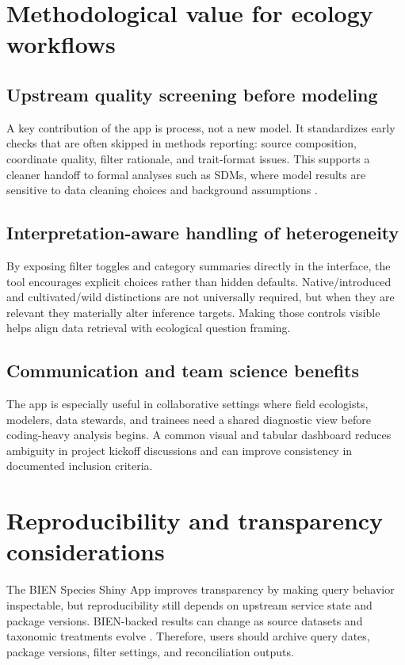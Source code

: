 \documentclass[11pt]{article}
\begin{document}
\section*{Methodological value for ecology workflows}
\subsection*{Upstream quality screening before modeling}
A key contribution of the app is process, not a new model. It standardizes early checks that are often skipped in methods reporting: source composition, coordinate quality, filter rationale, and trait-format issues. This supports a cleaner handoff to formal analyses such as SDMs, where model results are sensitive to data cleaning choices and background assumptions \citep{Merow2013MaxEntGuide, Merow2014Maxlike}.

\subsection*{Interpretation-aware handling of heterogeneity}
By exposing filter toggles and category summaries directly in the interface, the tool encourages explicit choices rather than hidden defaults. Native/introduced and cultivated/wild distinctions are not universally required, but when they are relevant they materially alter inference targets. Making those controls visible helps align data retrieval with ecological question framing.

\subsection*{Communication and team science benefits}
The app is especially useful in collaborative settings where field ecologists, modelers, data stewards, and trainees need a shared diagnostic view before coding-heavy analysis begins. A common visual and tabular dashboard reduces ambiguity in project kickoff discussions and can improve consistency in documented inclusion criteria.

\section*{Reproducibility and transparency considerations}
The BIEN Species Shiny App improves transparency by making query behavior inspectable, but reproducibility still depends on upstream service state and package versions. BIEN-backed results can change as source datasets and taxonomic treatments evolve \citep{Enquist2026BIEN, Maitner2025BIEN}. Therefore, users should archive query dates, package versions, filter settings, and reconciliation outputs.
\end{document}
